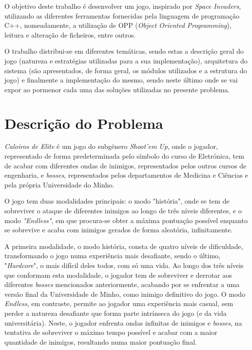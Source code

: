 \documentclass[a4paper,11pt]{article}
\newcommand\tab[1][0.8cm]{\hspace*{#1}}
\begin{document}
\vspace{8pt}

O objetivo deste trabalho é desenvolver um jogo, inspirado por \textit{Space Invaders}, utilizando as diferentes ferramentas fornecidas pela linguagem de programação C++, nomeadamente, a utilização de OPP (\textit{Object Oriented Programming}), leitura e alteração de ficheiros, entre outros.

\vspace{8pt}

O trabalho distribui-se em diferentes temáticas, sendo estas a descrição geral do jogo (natureza e estratégias utilizadas para a sua implementação),  arquitetura do sistema (são apresentados, de forma geral, os módulos utilizados e a estrutura do jogo) e finalmente a implementação do mesmo, sendo neste último onde se vai expor ao pormenor cada uma das soluções utilizadas no presente problema.

\pagebreak

\section{Descrição do Problema}

\vspace{8pt}

\tab
\textit{Caloiros de Elite} é um jogo do subgénero \textit{Shoot'em Up}, onde o jogador, representado de forma predeterminada pelo símbolo do curso de Eletrónica, tem de acabar com diferentes ondas de inimigos, representados pelos outros cursos de engenharia, e \textit{bosses}, representados pelos departamentos de Medicina e Ciências e pela própria Universidade do Minho. 

\vspace{8pt}

O jogo tem duas modalidades principais: o modo "história", onde se tem de sobreviver o ataque de diferentes inimigos ao longo de três níveis diferentes, e o modo \textit{"Endless"}, em que procura-se obter a máxima pontuação possível enquanto se sobrevive e acaba com inimigos gerados de forma aleatória, infinitamente.

\vspace{8pt}

A primeira modalidade, o modo história, consta de quatro níveis de dificuldade, transformando o jogo numa experiência mais desafiante, sendo o último, "\textit{Hardcore}", o mais difícil deles todos, com só uma vida. Ao longo dos três níveis que conformam esta modalidade, o jogador tem de sobreviver e derrotar aos diferentes \textit{bosses} mencionados anteriormente, acabando por se enfrentar a uma versão final da Universidade de Minho, como inimigo definitivo do jogo. O modo \textit{Endless}, em contraste, permite ao jogador uma experiência mais casual, sem perder a natureza desafiante que forma parte intrínseca do jogo (e da vida universitária). Neste, o jogador enfrenta ondas infinitas de inimigos e \textit{bosses}, na tentativa de sobreviver o máximo tempo possível e acabar com a maior quantidade de inimigos, resultando numa maior pontuação final.
\end{document}
